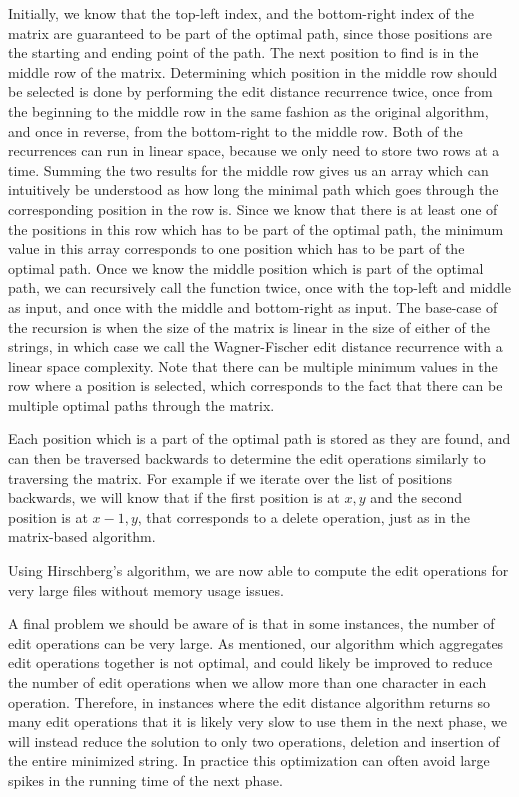 Initially, we know that the top-left index, and the bottom-right index of the matrix are
guaranteed to be part of the optimal path, since those positions are the starting and
ending point of the path. The next position to find is in the middle row of the matrix.
Determining which position in the middle row should be selected is done by performing the
edit distance recurrence twice, once from the beginning to the middle row in the same
fashion as the original algorithm, and once in reverse, from the bottom-right to the
middle row. Both of the recurrences can run in linear space, because we only need to store
two rows at a time. Summing the two results for the middle row gives us an array which can
intuitively be understood as how long the minimal path which goes through the
corresponding position in the row is. Since we know that there is at least one of the
positions in this row which has to be part of the optimal path, the minimum value in this
array corresponds to one position which has to be part of the optimal path. Once we know
the middle position which is part of the optimal path, we can recursively call the
function twice, once with the top-left and middle as input, and once with the middle and
bottom-right as input. The base-case of the recursion is when the size of the matrix is
linear in the size of either of the strings, in which case we call the Wagner-Fischer edit
distance recurrence with a linear space complexity. Note that there can be multiple
minimum values in the row where a position is selected, which corresponds to the fact that
there can be multiple optimal paths through the matrix.

Each position which is a part of the optimal path is stored as they are found, and can
then be traversed backwards to determine the edit operations similarly to traversing the
matrix. For example if we iterate over the list of positions backwards, we will know that
if the first position is at $x, y$ and the second position is at $x - 1, y$, that
corresponds to a delete operation, just as in the matrix-based algorithm.

Using Hirschberg's algorithm, we are now able to compute the edit operations for very
large files without memory usage issues.

A final problem we should be aware of is that in some instances, the number of edit
operations can be very large. As mentioned, our algorithm which aggregates edit operations
together is not optimal, and could likely be improved to reduce the number of edit
operations when we allow more than one character in each operation. Therefore, in
instances where the edit distance algorithm returns so many edit operations that it is
likely very slow to use them in the next phase, we will instead reduce the solution to
only two operations, deletion and insertion of the entire minimized string. In practice
this optimization can often avoid large spikes in the running time of the next phase.

